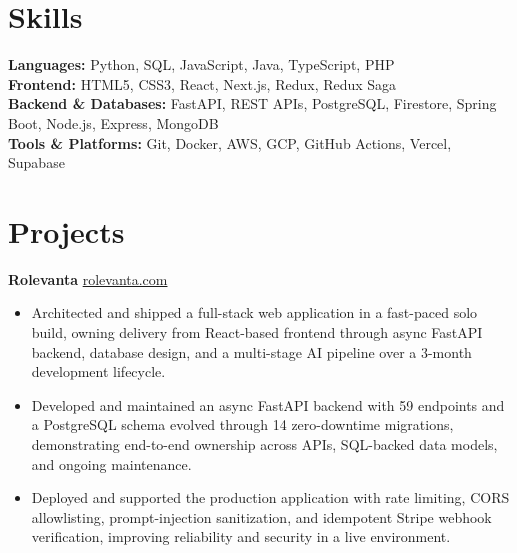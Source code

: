 \documentclass[11pt]{article}       %
\begin{document}
\vspace{-10.5pt}

\section*{Skills}
\textbf{Languages:} Python, SQL, JavaScript, Java, TypeScript, PHP \\
\textbf{Frontend:} HTML5, CSS3, React, Next.js, Redux, Redux Saga \\
\textbf{Backend \& Databases:} FastAPI, REST APIs, PostgreSQL, Firestore, Spring Boot, Node.js, Express, MongoDB \\
\textbf{Tools \& Platforms:} Git, Docker, AWS, GCP, GitHub Actions, Vercel, Supabase
\vspace{-5pt}






\section*{Projects}
\textbf{Rolevanta} \hfill \href{https://rolevanta.com}{rolevanta.com} \\
\vspace{-9pt}
\begin{itemize}
  \item Architected and shipped a full-stack web application in a fast-paced solo build, owning delivery from React-based frontend through async FastAPI backend, database design, and a multi-stage AI pipeline over a 3-month development lifecycle.
  \item Developed and maintained an async FastAPI backend with 59 endpoints and a PostgreSQL schema evolved through 14 zero-downtime migrations, demonstrating end-to-end ownership across APIs, SQL-backed data models, and ongoing maintenance.
  \item Deployed and supported the production application with rate limiting, CORS allowlisting, prompt-injection sanitization, and idempotent Stripe webhook verification, improving reliability and security in a live environment.
\end{itemize}
\end{document}
